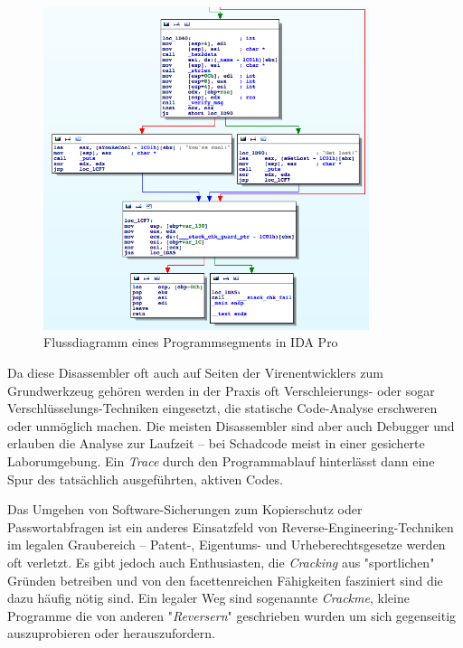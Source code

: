 \begin{figure}[h]
  \begin{center}
	\includegraphics[width=0.85\textwidth]{IDA-pro-flowdiagram.png}
  \end{center}
  \caption{Flussdiagramm eines Programmsegments in IDA Pro}
\end{figure}

Da diese Disassembler oft auch auf Seiten der Virenentwicklers zum Grundwerkzeug gehören werden in der Praxis oft Verschleierungs- oder sogar Verschlüsselungs-Techniken eingesetzt, die statische Code-Analyse erschweren oder unmöglich machen. Die meisten Disassembler sind aber auch Debugger und erlauben die Analyse zur Laufzeit – bei Schadcode meist in einer gesicherte Laborumgebung. Ein \emph{Trace} durch den Programmablauf hinterlässt dann eine Spur des tatsächlich ausgeführten, aktiven Codes.

Das Umgehen von Software-Sicherungen zum Kopierschutz oder Passwortabfragen ist ein anderes Einsatzfeld von Reverse-Engineering-Techniken im legalen Graubereich – Patent-, Eigentums- und Urheberechtsgesetze werden oft verletzt. Es gibt jedoch auch Enthusiasten, die \emph{Cracking} aus "sportlichen" Gründen betreiben und von den facettenreichen Fähigkeiten fasziniert sind die dazu häufig nötig sind. Ein legaler Weg sind sogenannte \emph{Crackme}, kleine Programme die von anderen "\emph{Reversern}" geschrieben wurden um sich gegenseitig auszuprobieren oder herauszufordern.

